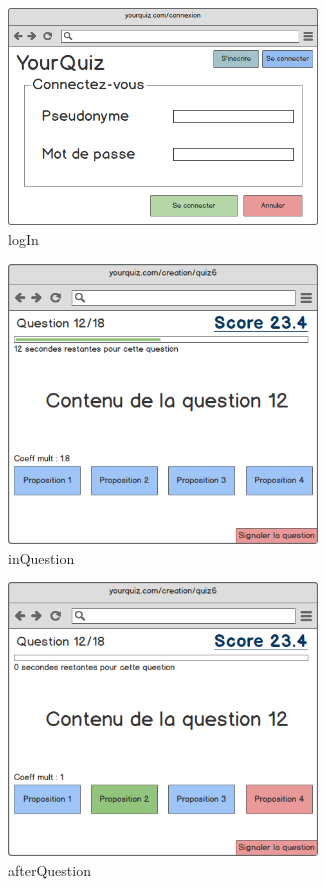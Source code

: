 \documentclass[a4paper, 12pt]{article}
\begin{document}
\begin{figure}
	\begin{center}
		\includegraphics[width=0.73\textwidth]{../mockups/png/logIn.png}
        \caption{logIn}
	\end{center}
\end{figure}
\begin{figure}
	\begin{center}
		\includegraphics[width=0.73\textwidth]{../mockups/png/inQuestion.png}
        \caption{inQuestion}
	\end{center}
\end{figure}
\begin{figure}
	\begin{center}
		\includegraphics[width=0.73\textwidth]{../mockups/png/afterQuestion.png}
        \caption{afterQuestion}
	\end{center}
\end{figure}
\end{document}

